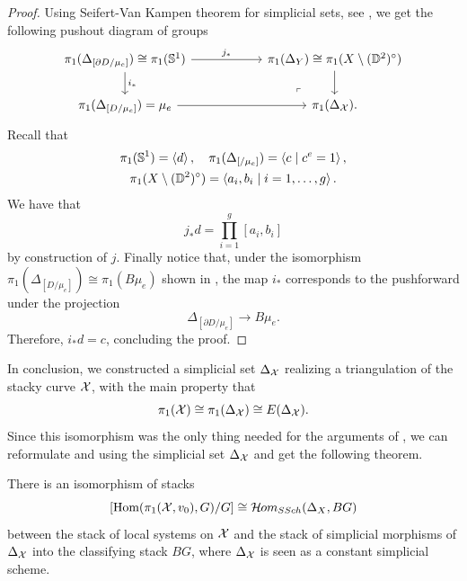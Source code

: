 \begin{proof}
Using Seifert-Van Kampen theorem for simplicial sets, see \cite[\S III, Theorem 1.4]{SimplicialHomotopyTheory}, we get the following pushout diagram of groups
\begin{equation}
\begin{tikzcd}
	{\pi_1(\Delta_{[\partial D / \mu_e]}) \cong \pi_1(\Sb^1)} & {} & {\pi_1(\Delta_Y) \cong \pi_1(X \setminus (\Db^2)^{\circ})} \\
	{\pi_1(\Delta_{[D / \mu_e]}) = \mu_e} && {\pi_1(\Delta_{\mc{X}}).}
	\arrow["{j_*}", from=1-1, to=1-3]
	\arrow["{i_*}", from=1-1, to=2-1]
	\arrow[from=1-3, to=2-3]
	\arrow[from=2-1, to=2-3]
	\arrow["\lrcorner"{anchor=center, pos=0.125, rotate=180}, draw=none, from=2-3, to=1-2]
\end{tikzcd}
\end{equation}
Recall that
\begin{gather}
\pi_1(\mathbb{S}^1)=\left< d \right>, \quad \pi_1(\Delta_{[/ \mu_e]}) = \left< c \mid c^e=1 \right>,\\
\pi_1(X \setminus (\mathbb{D}^2)^{\circ}) = \left< a_i, b_i \mid i=1,\dots,g \right>.
\end{gather}
We have that
\begin{equation}
j_* d = \prod_{i=1}^{g} [a_i, b_i]
\end{equation}
by construction of $j$. Finally notice that, under the isomorphism $\pi_1(\Delta_{[D/ \mu_e]}) \cong \pi_1(B \mu_e)$ shown in , the map $i_*$ corresponds to the pushforward under the projection
\begin{equation}
\Delta_{[\partial D / \mu_e]} \to B \mu_e.
\end{equation}
Therefore, $i_* d = c$, concluding the proof.
\end{proof}

In conclusion, we constructed a simplicial set $\Delta_{\mathcal{X}}$ realizing a triangulation of the stacky curve $\mathcal{X}$, with the main property that
\begin{equation}
\pi_1(\mathcal{X}) \cong \pi_{1}(\Delta_{\mathcal{X}}) \cong E(\Delta_{\mathcal{X}}).
\end{equation}
Since this isomorphism was the only thing needed for the arguments of , we can reformulate  and  using the simplicial set $\Delta_{\mathcal{X}}$ and get the following theorem.
\begin{thm}
There is an isomorphism of stacks
\begin{equation}
\left[ \text{Hom}(\pi_1(\mathcal{X}, v_0), G) / G \right] \cong \mathcal{H}\kern -.5pt om_{SSch}(\Delta_X, BG)
\end{equation}
between the stack of local systems on $\mathcal{X}$ and the stack of simplicial morphisms of $\Delta_{\mathcal{X}}$ into the classifying stack $BG$, where $\Delta_{\mathcal{X}}$ is seen as a constant simplicial scheme.
\end{thm}

